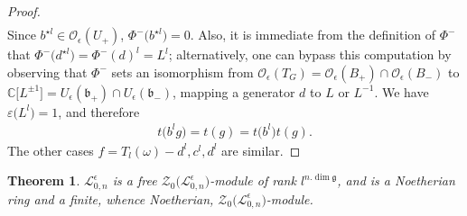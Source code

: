 \documentclass[10pt,a4paper]{amsart}
\numberwithin{equation}{section}
\newtheorem{teo}{Theorem}[section]
\theoremstyle{definition}
\newcommand{\e}{\epsilon}
\newcommand{\mc}{\mathbb{C}}
\newcommand{\Ll}{{\mathcal L}}
\newcommand{\Oo}{{\mathcal O}}
\begin{document}
\begin{proof}
\begin{align*}
 \end{align*}
Since $b^{\star l}\in \Oo_\e(U_+)$, $\Phi^-\big(b^{\star l}\big)=0$. Also, it is immediate from the definition of $\Phi^-$ that $\Phi^-\big(d^{\star l}\big) = \Phi^-(d)^l = L^{l}$; alternatively, one can bypass this computation by observing that $\Phi^-$ sets an isomorphism from $\Oo_\e(T_G) = \Oo_\e(B_+)\cap \Oo_\e(B_-)$ to $\mc\big[L^{\pm 1}\big] = U_\e(\mathfrak{b}_+)\cap U_\e(\mathfrak{b}_-)$, mapping a generator $d$ to $L$ or $L^{-1}$. We have $\varepsilon\big(L^l\big)=1$, and therefore
\begin{align*}
t\big(b^lg\big) = t(g) = t\big(b^l\big)t(g).
 \end{align*}
The other cases $f=T_l(\omega)-d^l, c^l,d^l$ are similar.
\end{proof}

\begin{teo} \label{modZ0} $\Ll_{0,n}^\e$ is a free $\mathcal{Z}_0\bigl(\Ll_{0,n}^\e\bigr)$-module of rank $l^{n.\dim \mathfrak{g}}$, and \smash{$\bigl(\Ll_{0,n}^\e\bigr)^{U_\e}$} is a Noetherian ring and a finite, whence Noetherian, $\mathcal{Z}_0\bigl(\Ll_{0,n}^\e\bigr)$-module.
\end{teo}
\end{document}

